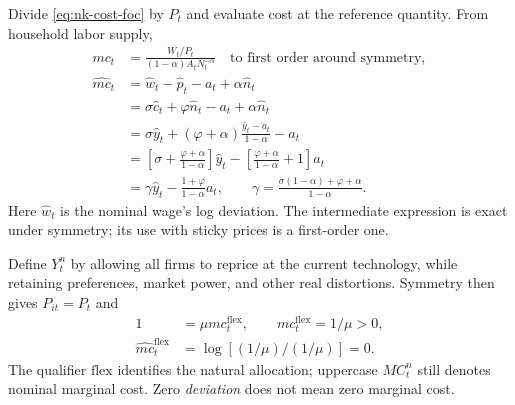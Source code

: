 Divide \eqref{eq:nk-cost-foc} by $P_t$ and evaluate cost at the reference
quantity. From household labor supply,
\begin{align}
 mc_t&=\frac{W_t/P_t}{(1-\alpha)A_tN_t^{-\alpha}}
       \quad\text{to first order around symmetry},\\
 \hat{mc}_t
 &=\hat w_t-\hat p_t-a_t+\alpha\hat n_t\\
 &=\sigma\hat c_t+\varphi\hat n_t-a_t+\alpha\hat n_t\\
 &=\sigma\hat y_t+(\varphi+\alpha)
                   \frac{\hat y_t-a_t}{1-\alpha}-a_t\\
 &=\left[\sigma+\frac{\varphi+\alpha}{1-\alpha}\right]\hat y_t
              -\left[\frac{\varphi+\alpha}{1-\alpha}+1\right]a_t\\
 &=\gamma\hat y_t-\frac{1+\varphi}{1-\alpha}a_t,
 \qquad\gamma=\frac{\sigma(1-\alpha)+\varphi+\alpha}{1-\alpha}.
 \label{eq:nk-mc-output}
\end{align}
Here $\hat w_t$ is the nominal wage's log deviation. The intermediate expression
is exact under symmetry; its use with sticky prices is a first-order one.

Define $Y_t^n$ by allowing all firms to reprice at the current technology,
while retaining preferences, market power, and other real distortions.
Symmetry then gives $P_{it}=P_t$ and
\begin{align}
 1&=\mu mc_t^{\mathrm{flex}},\qquad mc_t^{\mathrm{flex}}=1/\mu>0,\\
 \hat{mc}_t^{\mathrm{flex}}
 &=\log[(1/\mu)/(1/\mu)]=0.
\end{align}
The qualifier $\mathrm{flex}$ identifies the natural allocation; uppercase
$MC_t^n$ still denotes nominal marginal cost. Zero \emph{deviation} does not
mean zero marginal cost.

